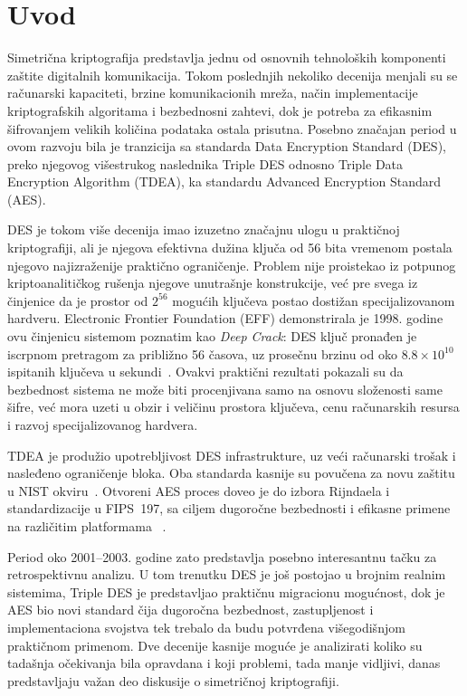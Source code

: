 \section{Uvod}
\label{sec:uvod}

Simetrična kriptografija predstavlja jednu od osnovnih tehnoloških
komponenti zaštite digitalnih komunikacija. Tokom poslednjih nekoliko
decenija menjali su se računarski kapaciteti, brzine komunikacionih
mreža, način implementacije kriptografskih algoritama i bezbednosni
zahtevi, dok je potreba za efikasnim šifrovanjem velikih količina
podataka ostala prisutna. Posebno značajan period u ovom razvoju bila
je tranzicija sa standarda Data Encryption Standard (DES), preko
njegovog višestrukog naslednika Triple DES odnosno Triple Data
Encryption Algorithm (TDEA), ka standardu Advanced Encryption Standard
(AES).

DES je tokom više decenija imao izuzetno značajnu ulogu u praktičnoj
kriptografiji, ali je njegova efektivna dužina ključa od 56 bita
vremenom postala njegovo najizraženije praktično ograničenje.
Problem nije proistekao iz potpunog kriptoanalitičkog rušenja njegove
unutrašnje konstrukcije, već pre svega iz činjenice da je prostor od
$2^{56}$ mogućih ključeva postao dostižan specijalizovanom hardveru.
Electronic Frontier Foundation (EFF)
demonstrirala je 1998. godine ovu činjenicu sistemom poznatim kao
\emph{Deep Crack}: DES ključ pronađen je iscrpnom pretragom za približno
56 časova, uz prosečnu brzinu od oko $8.8\times10^{10}$ ispitanih
ključeva u sekundi~\cite{eff-des-cracker-1998}. Ovakvi praktični
rezultati pokazali su da bezbednost sistema ne može biti procenjivana
samo na osnovu složenosti same šifre, već mora uzeti u obzir i veličinu
prostora ključeva, cenu računarskih resursa i razvoj specijalizovanog
hardvera.

TDEA je produžio upotrebljivost DES infrastrukture, uz veći računarski
trošak i nasleđeno ograničenje bloka. Oba standarda kasnije su povučena
za novu zaštitu u NIST okviru~\cite{nist-des-withdrawal-2005,
nist-tdea-withdrawal-2023}. Otvoreni AES proces doveo je do izbora
Rijndaela i standardizacije u FIPS~197, sa ciljem dugoročne bezbednosti
i efikasne primene na različitim platformama
~\cite{nist-aes-report-2001,nist-aes-development-2021,fips197-2001}.

Period oko 2001--2003. godine zato predstavlja posebno interesantnu
tačku za retrospektivnu analizu. U tom trenutku DES je još postojao u
brojnim realnim sistemima, Triple DES je predstavljao praktičnu
migracionu mogućnost, dok je AES bio novi standard čija dugoročna
bezbednost, zastupljenost i implementaciona svojstva tek trebalo da
budu potvrđena višegodišnjom praktičnom primenom. Dve decenije kasnije
moguće je analizirati koliko su tadašnja očekivanja bila opravdana i
koji problemi, tada manje vidljivi, danas predstavljaju važan deo
diskusije o simetričnoj kriptografiji.

